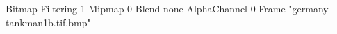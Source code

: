 {Bitmap
	{Filtering 1}
	{Mipmap 0}
	{Blend none}
	{AlphaChannel 0}
	{Frame "germany-tankman1b.tif.bmp"}
}
